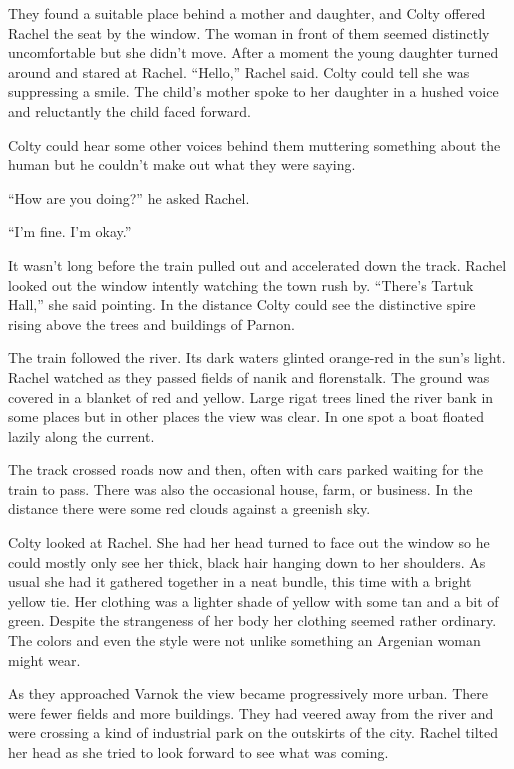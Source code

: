They found a suitable place behind a mother and daughter, and Colty offered Rachel the seat by
the window. The woman in front of them seemed distinctly uncomfortable but she didn't move.
After a moment the young daughter turned around and stared at Rachel. ``Hello,'' Rachel said.
Colty could tell she was suppressing a smile. The child's mother spoke to her daughter in a
hushed voice and reluctantly the child faced forward.

Colty could hear some other voices behind them muttering something about the human but he
couldn't make out what they were saying.

``How are you doing?'' he asked Rachel.

``I'm fine. I'm okay.''

It wasn't long before the train pulled out and accelerated down the track. Rachel looked out the
window intently watching the town rush by. ``There's Tartuk Hall,'' she said pointing. In the
distance Colty could see the distinctive spire rising above the trees and buildings of Parnon.

The train followed the river. Its dark waters glinted orange-red in the sun's light. Rachel
watched as they passed fields of nanik and florenstalk. The ground was covered in a blanket of
red and yellow. Large rigat trees lined the river bank in some places but in other places the
view was clear. In one spot a boat floated lazily along the current.


The track crossed roads now and then, often with cars parked waiting for the train to pass.
There was also the occasional house, farm, or business. In the distance there were some red
clouds against a greenish sky.

Colty looked at Rachel. She had her head turned to face out the window so he could mostly only
see her thick, black hair hanging down to her shoulders. As usual she had it gathered together
in a neat bundle, this time with a bright yellow tie. Her clothing was a lighter shade of yellow
with some tan and a bit of green. Despite the strangeness of her body her clothing seemed rather
ordinary. The colors and even the style were not unlike something an Argenian woman might wear.

As they approached Varnok the view became progressively more urban. There were fewer fields and
more buildings. They had veered away from the river and were crossing a kind of industrial park
on the outskirts of the city. Rachel tilted her head as she tried to look forward to see what
was coming.

